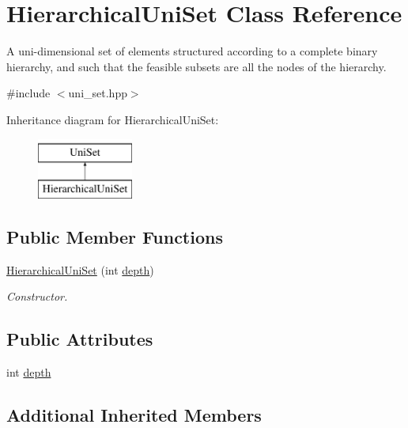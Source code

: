 \hypertarget{classHierarchicalUniSet}{\section{Hierarchical\-Uni\-Set Class Reference}
\label{classHierarchicalUniSet}
}


A uni-\/dimensional set of elements structured according to a complete binary hierarchy, and such that the feasible subsets are all the nodes of the hierarchy.  




{\ttfamily \#include $<$uni\-\_\-set.\-hpp$>$}

Inheritance diagram for Hierarchical\-Uni\-Set\-:\begin{figure}[H]
\begin{center}
\leavevmode
\includegraphics[height=2.000000cm]{classHierarchicalUniSet}
\end{center}
\end{figure}
\subsection*{Public Member Functions}
\begin{DoxyCompactItemize}
\item 
\hyperlink{classHierarchicalUniSet_ab6bfd19708056eb61eb0cd297a96aef0}{Hierarchical\-Uni\-Set} (int \hyperlink{classHierarchicalUniSet_a3b87358df90ea24612e82df44c4eac04}{depth})
\begin{DoxyCompactList}\small\item\em Constructor. \end{DoxyCompactList}\end{DoxyCompactItemize}
\subsection*{Public Attributes}
\begin{DoxyCompactItemize}
\item 
int \hyperlink{classHierarchicalUniSet_a3b87358df90ea24612e82df44c4eac04}{depth}
\end{DoxyCompactItemize}
\subsection*{Additional Inherited Members}


